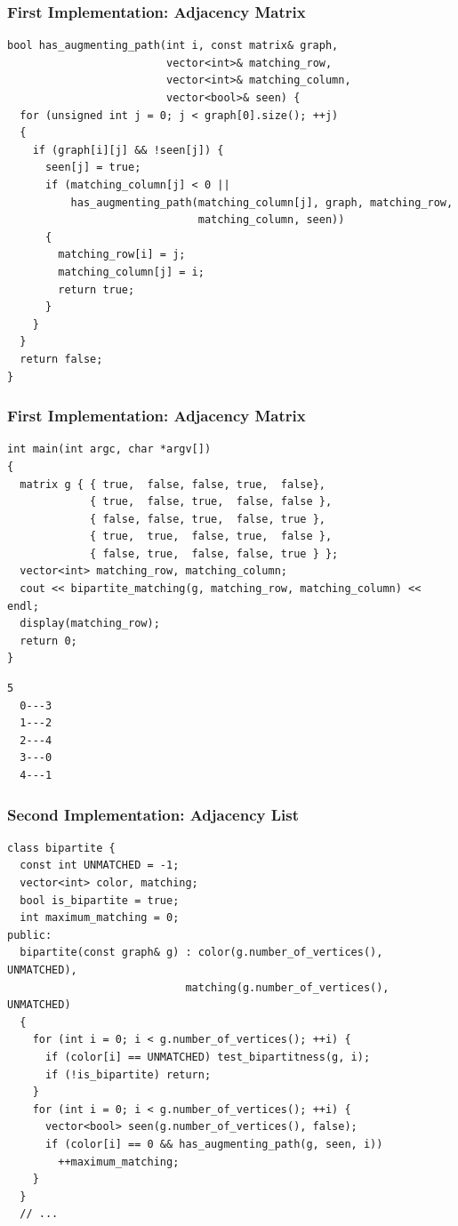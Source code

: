 \documentclass{beamer}
\begin{document}
\begin{frame}[containsverbatim]
\frametitle{First Implementation: Adjacency Matrix}
\scriptsize

\begin{lstlisting}
bool has_augmenting_path(int i, const matrix& graph,
                         vector<int>& matching_row,
                         vector<int>& matching_column,
                         vector<bool>& seen) {
  for (unsigned int j = 0; j < graph[0].size(); ++j)
  {
    if (graph[i][j] && !seen[j]) {
      seen[j] = true;
      if (matching_column[j] < 0 ||
          has_augmenting_path(matching_column[j], graph, matching_row,
                              matching_column, seen))
      {
        matching_row[i] = j;
        matching_column[j] = i;
        return true;
      }
    }
  }
  return false;
}
\end{lstlisting}

\end{frame}

\begin{frame}[containsverbatim]
\frametitle{First Implementation: Adjacency Matrix}
\scriptsize

\begin{lstlisting}
int main(int argc, char *argv[])
{
  matrix g { { true,  false, false, true,  false},
             { true,  false, true,  false, false },
             { false, false, true,  false, true },
             { true,  true,  false, true,  false },
             { false, true,  false, false, true } };
  vector<int> matching_row, matching_column;
  cout << bipartite_matching(g, matching_row, matching_column) << endl;
  display(matching_row);
  return 0;
}
\end{lstlisting}

\begin{verbatim}
5
  0---3
  1---2
  2---4
  3---0
  4---1
\end{verbatim}

\end{frame}

\begin{frame}[containsverbatim]
\frametitle{Second Implementation: Adjacency List}
\scriptsize

\begin{lstlisting}
class bipartite {
  const int UNMATCHED = -1;
  vector<int> color, matching;
  bool is_bipartite = true;
  int maximum_matching = 0;
public:
  bipartite(const graph& g) : color(g.number_of_vertices(), UNMATCHED),
                            matching(g.number_of_vertices(), UNMATCHED)
  {
    for (int i = 0; i < g.number_of_vertices(); ++i) {
      if (color[i] == UNMATCHED) test_bipartitness(g, i);
      if (!is_bipartite) return;
    }
    for (int i = 0; i < g.number_of_vertices(); ++i) {
      vector<bool> seen(g.number_of_vertices(), false);
      if (color[i] == 0 && has_augmenting_path(g, seen, i))
        ++maximum_matching;
    }
  }
  // ...
\end{lstlisting}

\end{frame}
\end{document}
